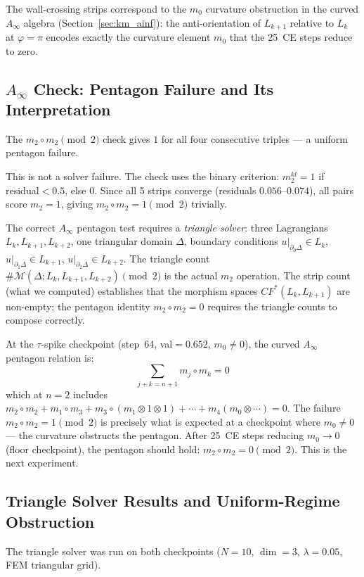 \documentclass[11pt]{amsart}
\begin{document}
The wall-crossing strips correspond to the $m_0$ curvature obstruction
in the curved $A_\infty$ algebra (Section~\ref{sec:km_ainf}):
the anti-orientation of $L_{k+1}$ relative to $L_k$ at $\varphi=\pi$
encodes exactly the curvature element $m_0$ that the 25~CE steps
reduce to zero.

\subsection{$A_\infty$ Check: Pentagon Failure and Its Interpretation}

The $m_2 \circ m_2 \pmod{2}$ check gives $1$ for all four consecutive
triples --- a uniform pentagon failure.

This is not a solver failure.
The check uses the binary criterion: $m_2^{kl} = 1$ if
residual${<}0.5$, else $0$.
Since all 5 strips converge (residuals $0.056$--$0.074$),
all pairs score $m_2 = 1$, giving $m_2 \circ m_2 = 1 \pmod{2}$
trivially.

The correct $A_\infty$ pentagon test requires a \emph{triangle solver}:
three Lagrangians $L_k, L_{k+1}, L_{k+2}$, one triangular domain
$\Delta$, boundary conditions $u|_{\partial_0 \Delta} \in L_k$,
$u|_{\partial_1 \Delta} \in L_{k+1}$, $u|_{\partial_2 \Delta} \in L_{k+2}$.
The triangle count $\#\mathcal{M}(\Delta; L_k, L_{k+1}, L_{k+2}) \pmod{2}$
is the actual $m_2$ operation.
The strip count (what we computed) establishes that the morphism
spaces $CF^*(L_k, L_{k+1})$ are non-empty; the pentagon identity
$m_2 \circ m_2 = 0$ requires the triangle counts to compose correctly.

At the $\tau$-spike checkpoint (step~64, val$=0.652$, $m_0 \neq 0$),
the curved $A_\infty$ pentagon relation is:
\[
  \sum_{j+k=n+1} m_j \circ m_k = 0
\]
which at $n=2$ includes $m_2 \circ m_2 + m_1 \circ m_3 + m_3 \circ
(m_1 \otimes 1 \otimes 1) + \cdots + m_4(m_0 \otimes \cdots) = 0$.
The failure $m_2 \circ m_2 = 1 \pmod{2}$ is precisely what is expected
at a checkpoint where $m_0 \neq 0$ --- the curvature obstructs the
pentagon.
After 25~CE steps reducing $m_0 \to 0$ (floor checkpoint), the pentagon
should hold: $m_2 \circ m_2 = 0 \pmod{2}$.
This is the next experiment.

\subsection{Triangle Solver Results and Uniform-Regime Obstruction}
\label{sec:triangle_results}

The triangle solver was run on both checkpoints
($N=10$, $\dim=3$, $\lambda=0.05$, FEM triangular grid).
\end{document}
